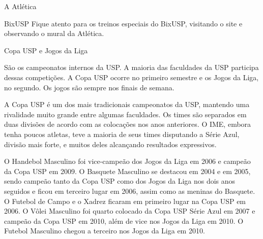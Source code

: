 \begin{secao}{A Atlética}
\begin{subsecao}{BixUSP}
Fique atento para os treinos especiais do BixUSP, visitando o site e observando 
o mural da Atlética.

\end{subsecao}
\begin{subsecao}{Copa USP e Jogos da Liga}

São os campeonatos internos da USP. A maioria das faculdades da USP participa
dessas competições. A Copa USP ocorre no primeiro semestre e os Jogos da Liga,
no segundo. Os jogos são sempre nos finais de semana.

A Copa USP é um dos mais tradicionais campeonatos da USP, mantendo uma
rivalidade muito grande entre algumas faculdades. Os times são separados em
duas divisões de acordo com as colocações nos anos anteriores. O IME, embora
tenha poucos atletas, teve a maioria de seus times disputando a Série Azul,
divisão mais forte, e muitos deles alcançando resultados expressivos.

%	  


O Handebol Masculino foi vice-campeão dos Jogos da Liga em 2006 e campeão da
Copa USP em 2009. O Basquete Masculino se destacou em 2004 e em 2005, sendo
campeão tanto da Copa USP como dos Jogos da Liga nos dois anos seguidos e ficou
em terceiro lugar em 2006, assim como as meninas do Basquete. O Futebol de
Campo e o Xadrez ficaram em primeiro lugar na Copa USP em 2006. O Vôlei
Masculino foi quarto colocado da Copa USP Série Azul em 2007 e campeão da Copa
USP em 2010, além de vice nos Jogos da Liga em 2010. O Futebol Masculino chegou
a terceiro nos Jogos da Liga em 2010.


\end{subsecao}
\end{secao}
